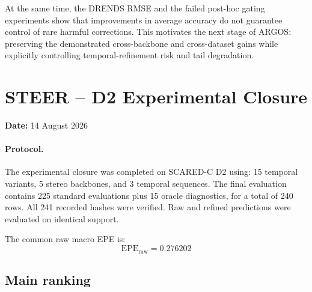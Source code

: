 \documentclass[11pt,a4paper]{article}
\providecommand{\EPE}{\mathrm{EPE}}
\begin{document}
At the same time, the DRENDS RMSE and the failed post-hoc gating
experiments show that improvements in average accuracy do not guarantee
control of rare harmful corrections.
This motivates the next stage of ARGOS: preserving the demonstrated
cross-backbone and cross-dataset gains while explicitly controlling
temporal-refinement risk and tail degradation.

\section*{STEER -- D2 Experimental Closure}
\textbf{Date:} 14 August 2026

\paragraph{Protocol.}
The experimental closure was completed on SCARED-C D2 using:
15 temporal variants, 5 stereo backbones, and 3 temporal sequences.
The final evaluation contains 225 standard evaluations plus 15 oracle
diagnostics, for a total of 240 rows.
All 241 recorded hashes were verified.
Raw and refined predictions were evaluated on identical support.

The common raw macro EPE is:
\[
\boxed{
\EPE_{\mathrm{raw}} = 0.276202
}
\]

\subsection*{Main ranking}
\end{document}
